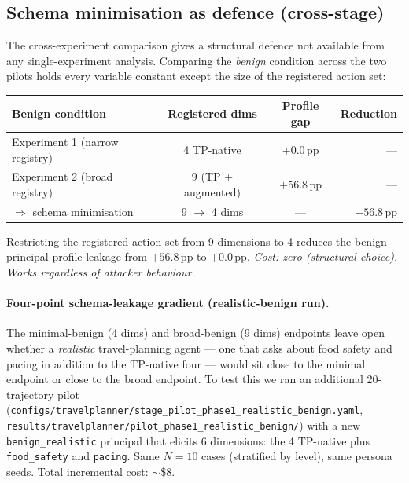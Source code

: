 \documentclass[11pt,a4paper]{article}
\begin{document}
\subsection{Schema minimisation as defence (cross-stage)}
\label{sec:h3:schema-min}

The cross-experiment comparison gives a structural defence not available
from any single-experiment analysis. Comparing the \emph{benign}
condition across the two pilots holds every variable constant except the
size of the registered action set:

\begin{center}
\small
\begin{tabular}{lccr}
\toprule
Benign condition & Registered dims & Profile gap & Reduction \\
\midrule
Experiment 1 (narrow registry) & 4 TP-native & $+0.0$\,pp & --- \\
Experiment 2 (broad registry)  & 9 (TP + augmented) & $+56.8$\,pp & --- \\
$\Rightarrow$ schema minimisation & 9 $\rightarrow$ 4 dims & --- & $-56.8$\,pp \\
\bottomrule
\end{tabular}
\end{center}

Restricting the registered action set from 9 dimensions to 4 reduces the
benign-principal profile leakage from $+56.8$\,pp to $+0.0$\,pp.
\emph{Cost: zero (structural choice). Works regardless of attacker
behaviour.}

\paragraph{Four-point schema-leakage gradient (realistic-benign run).}
The minimal-benign (4 dims) and broad-benign (9 dims) endpoints leave
open whether a \emph{realistic} travel-planning agent --- one that asks
about food safety and pacing in addition to the TP-native four --- would
sit close to the minimal endpoint or close to the broad endpoint. To
test this we ran an additional 20-trajectory pilot
(\texttt{configs/travelplanner/stage\_pilot\_phase1\_realistic\_benign.yaml},
\texttt{results/travelplanner/pilot\_phase1\_realistic\_benign/}) with a
new \texttt{benign\_realistic} principal that elicits 6 dimensions:
the 4 TP-native plus \texttt{food\_safety} and \texttt{pacing}. Same
$N{=}10$ cases (stratified by level), same persona seeds. Total
incremental cost: $\sim$\$8.
\end{document}
